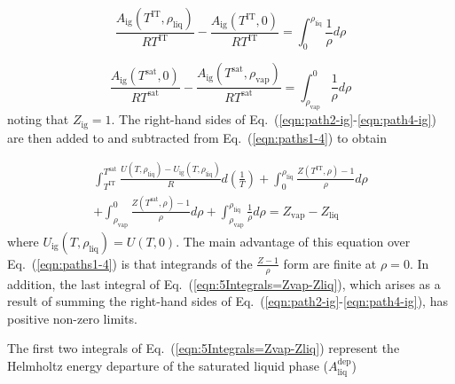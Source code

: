 \documentclass[5p,times]{elsarticle}
\begin{document}
\begin{equation}
\frac{A_\mathrm{ig}(T^\mathrm{IT},\rho_\mathrm{liq})}{RT^\mathrm{IT}}
-
\frac{A_\mathrm{ig}(T^\mathrm{IT},0)}{RT^\mathrm{IT}}
=
\int _{0}^{\rho_\mathrm{liq}} \frac{1}{\rho}  d\rho
\label{eqn:path2-ig}
\end{equation}

\begin{equation}
\frac{A_\mathrm{ig}(T^\mathrm{sat},0)}{RT^\mathrm{sat}}
-
\frac{A_\mathrm{ig}(T^\mathrm{sat},\rho_\mathrm{vap})}{RT^\mathrm{sat}}
=
\int _{\rho_\mathrm{vap}}^{0} \frac{1}{\rho}  d\rho
\label{eqn:path4-ig}
\end{equation} 
noting that $Z_\mathrm{ig}=1$. The right-hand sides of Eq.~(\ref{eqn:path2-ig}-\ref{eqn:path4-ig}) are then added to and subtracted from Eq.~(\ref{eqn:paths1-4}) to obtain

\begin{equation}
\begin{array}{l}
\int _{T^\mathrm{IT}}^{T^\mathrm{sat}} \frac{U(T,\rho_\mathrm{liq})-U_\mathrm{ig}(T,\rho_\mathrm{liq})}{R}  d\left(\frac{1}{T}\right)+\int _{0}^{\rho_\mathrm{liq}} \frac{Z(T^\mathrm{IT},\rho)-1}{\rho}  d\rho 
\\
+\int _{\rho_\mathrm{vap}}^{0} \frac{Z(T^\mathrm{sat},\rho)-1}{\rho}  d\rho+ \int _{\rho_\mathrm{vap}}^{\rho_\mathrm{liq}} \frac{1}{\rho}  d\rho =Z_\mathrm{vap} - Z_\mathrm{liq} 
\end{array}
\label{eqn:5Integrals=Zvap-Zliq}
\end{equation}
where $U_\mathrm{ig}(T,\rho_\mathrm{liq})=U(T,0)$. The main advantage of this equation over Eq.~(\ref{eqn:paths1-4}) is that integrands of the $\frac{Z-1}{\rho}$ form are finite at $\rho=0$. In addition, the last integral of Eq.~(\ref{eqn:5Integrals=Zvap-Zliq}), which arises as a result of summing the right-hand sides of Eq.~(\ref{eqn:path2-ig}-\ref{eqn:path4-ig}), has positive non-zero limits.

The first two integrals of Eq.~(\ref{eqn:5Integrals=Zvap-Zliq}) represent the Helmholtz energy departure of the saturated liquid phase ($A^\mathrm{dep}_\mathrm{liq}$)
\end{document}
